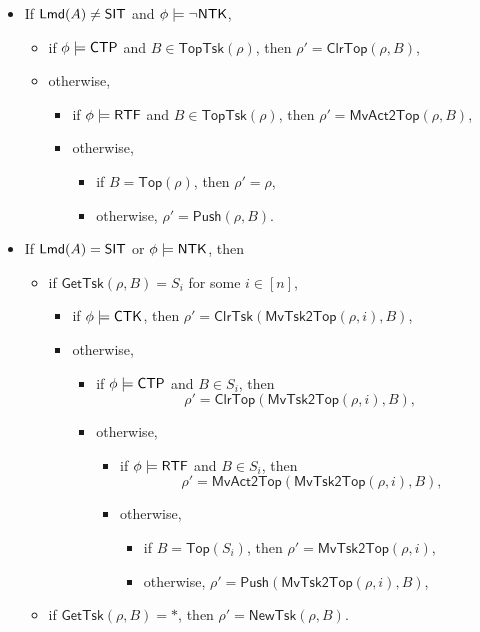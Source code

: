 \documentclass[preprint,12pt]{elsarticle}
\newcommand\lmd{{\sf Lmd}}
\newcommand\singleinstance{{\sf SIT}}
\newcommand\ntkflag{{\sf NTK}}
\newcommand\ctpflag{{\sf CTP}}
\newcommand\ctkflag{{\sf CTK}}
\newcommand\rtfflag{{\sf RTF}}
\newcommand\toptsk{\mathsf{TopTsk}}
\newcommand\topact{\mathsf{Top}}
\newcommand\push{\mathsf{Push}}
\newcommand\mvacttop{\mathsf{MvAct2Top}}
\newcommand\clrtop{\mathsf{ClrTop}}
\newcommand\clrtsk{\mathsf{ClrTsk}}
\newcommand\mvtsktop{\mathsf{MvTsk2Top}}
\newcommand\newtsk{\mathsf{NewTsk}}
\newcommand\gettsk{\mathsf{GetTsk}}
\begin{document}
\begin{itemize}
	\item If $\lmd(A) \neq \singleinstance$ and $\phi \models \neg \ntkflag$, 
	\begin{itemize}
		\item if $\phi \models\ctpflag$ and $B \in \toptsk(\rho)$, then $\rho' =\clrtop(\rho, B)$,
		\item otherwise,
		\begin{itemize}
			\item if $\phi \models \rtfflag$ and $B \in \toptsk(\rho)$, then $\rho'=\mvacttop(\rho, B)$,
			\item otherwise,
			\begin{itemize}
				\item if $B = \topact(\rho)$, then $\rho' = \rho$,
				\item otherwise, $\rho' = \push(\rho, B)$.
			\end{itemize}
		\end{itemize}
	\end{itemize}
	\item If $\lmd(A) = \singleinstance$ or $\phi \models \ntkflag$, then
	\begin{itemize}
		\item if $\gettsk(\rho, B) = S_i$ for some $i\in[n]$,
		\begin{itemize}
			\item if $\phi \models\ctkflag$, then $\rho' = \clrtsk(\mvtsktop(\rho, i), B)$,
			\item otherwise, 
			\begin{itemize}
				\item if $\phi \models\ctpflag$ and $B \in S_i$, then 
				$$\rho' =\clrtop(\mvtsktop(\rho, i), B),$$
				\item otherwise,
				\begin{itemize}
					\item if $\phi \models \rtfflag$ and $B \in S_i$, then 
					$$\rho'=\mvacttop(\mvtsktop(\rho, i), B),$$
					\item otherwise,
					\begin{itemize}
						\item if $B = \topact(S_i)$, then $\rho' = \mvtsktop(\rho, i)$,
						\item otherwise, $\rho'=\push(\mvtsktop(\rho, i), B)$,
					\end{itemize}
				\end{itemize}
			\end{itemize}
		\end{itemize}
		\item if $\gettsk(\rho, B) = *$, then $\rho' = \newtsk(\rho, B)$.
	\end{itemize}
\end{itemize}
\end{document}
